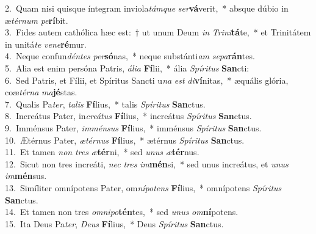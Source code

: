 {2.~}Quam nisi quisque íntegram inviola\textit{tám}\textit{que} \textit{ser}\textbf{vá}verit,~* absque dúbio in æ\textit{tér}\textit{num} \textit{pe}\textbf{rí}bit.\\
{3.~}Fides autem cathólica hæc est:~† ut unum Deum \textit{in} \textit{Tri}\textit{ni}\textbf{tá}te,~* et Trinitátem in unitá\textit{te} \textit{ve}\textit{ne}\textbf{ré}mur.\\
{4.~}Neque confun\textit{dén}\textit{tes} \textit{per}\textbf{só}nas,~* neque substánti\textit{am} \textit{se}\textit{pa}\textbf{rán}tes.\\
{5.~}Alia est enim persóna Patris, \textit{á}\textit{li}\textit{a} \textbf{Fí}lii,~* ália \textit{Spí}\textit{ri}\textit{tus} \textbf{San}cti:\\
{6.~}Sed Patris, et Fílii, et Spíritus Sancti u\textit{na} \textit{est} \textit{di}\textbf{ví}nitas,~* æquális glória, coæ\textit{tér}\textit{na} \textit{ma}\textbf{jé}stas.\\
{7.~}Qualis Pa\textit{ter}, \textit{ta}\textit{lis} \textbf{Fí}lius,~* talis \textit{Spí}\textit{ri}\textit{tus} \textbf{San}ctus.\\
{8.~}Increátus Pater, in\textit{cre}\textit{á}\textit{tus} \textbf{Fí}lius,~* increátus \textit{Spí}\textit{ri}\textit{tus} \textbf{San}ctus.\\
{9.~}Imménsus Pater, \textit{im}\textit{mén}\textit{sus} \textbf{Fí}lius,~* imménsus \textit{Spí}\textit{ri}\textit{tus} \textbf{San}ctus.\\
{10.~}Ætérnus Pater, \textit{æ}\textit{tér}\textit{nus} \textbf{Fí}lius,~* ætérnus \textit{Spí}\textit{ri}\textit{tus} \textbf{San}ctus.\\
{11.~}Et tamen \textit{non} \textit{tres} \textit{æ}\textbf{tér}ni,~* sed \textit{u}\textit{nus} \textit{æ}\textbf{tér}nus.\\
{12.~}Sicut non tres increáti, \textit{nec} \textit{tres} \textit{im}\textbf{mén}si,~* sed unus increátus, et \textit{u}\textit{nus} \textit{im}\textbf{mén}sus.\\
{13.~}Simíliter omnípotens Pater, om\textit{ní}\textit{po}\textit{tens} \textbf{Fí}lius,~* omnípotens \textit{Spí}\textit{ri}\textit{tus} \textbf{San}ctus.\\
{14.~}Et tamen non tres \textit{om}\textit{ni}\textit{po}\textbf{tén}tes,~* sed \textit{u}\textit{nus} \textit{om}\textbf{ní}potens.\\
{15.~}Ita Deus Pa\textit{ter}, \textit{De}\textit{us} \textbf{Fí}lius,~* Deus \textit{Spí}\textit{ri}\textit{tus} \textbf{San}ctus.\\
